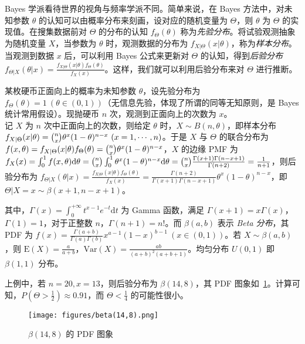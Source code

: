 \documentclass[../main.tex]{subfiles}
\begin{document}
Bayes 学派看待世界的视角与频率学派不同。简单来说，在 Bayes 方法中，对未知参数 $\theta$ 的认知可以由概率分布来刻画，设对应的随机变量为 $\Theta$，则 $\theta$ 为 $\Theta$ 的实现值。在搜集数据前对 $\Theta$ 的分布的认知 $f_\Theta(\theta)$ 称为\emph{先验分布}。将试验观测抽象为随机变量 $X$，当参数为 $\theta$ 时，观测数据的分布为 $f_{X|\Theta}(x|\theta)$，称为\emph{样本分布}。当观测到数据 $x$ 后，可以利用 Bayes 公式来更新对 $\Theta$ 的认知，得到\emph{后验分布} $f_{\Theta|X}(\theta|x)=\frac{f_{X|\Theta}(x|\theta)f_\Theta(\theta)}{f_X(x)}$。这样，我们就可以利用后验分布来对 $\Theta$ 进行推断。

\begin{example}
    某枚硬币正面向上的概率为未知参数 $\theta$，设先验分布为 $f_\Theta(\theta)=1\ (\theta\in(0,1))$（无信息先验，体现了所谓的同等无知原则，是 Bayes 统计常用假设）。现抛硬币 $n$ 次，观测到正面向上的次数为 $x$。\\
    记 $X$ 为 $n$ 次中正面向上的次数，则给定 $\theta$ 时，$X\sim B(n,\theta)$，即样本分布 $f_{X|\Theta}(x|\theta)=\tbinom nx\theta^x(1-\theta)^{n-x}\ (x=1,\cdots,n)$。于是 $X$ 与 $\Theta$ 的联合分布为 $f(x,\theta)=f_{X|\Theta}(x|\theta)f_\Theta(\theta)=\tbinom nx\theta^x(1-\theta)^{n-x}$，$X$ 的边缘 PMF 为 $f_X(x)=\int_0^1f(x,\theta)\mathrm d\theta=\tbinom nx\int_0^1\theta^x(1-\theta)^{n-x}\mathrm d\theta=\tbinom nx\frac{\Gamma(x+1)\Gamma(n-x+1)}{\Gamma(n+2)}=\frac1{n+1}$，则后验分布为 $f_{\Theta|X}(\theta|x)=\frac{f_{X|\Theta}(x|\theta)f_\Theta(\theta)}{f_X(x)}=\frac{\Gamma(n+2)}{\Gamma(x+1)\Gamma(n-x+1)}\theta^x(1-\theta)^{n-x}$，即 $\Theta|X=x\sim\beta(x+1,n-x+1)$。
\end{example}

其中，$\Gamma(x)=\int_0^{+\infty} t^{x-1}e^{-t}\mathrm dt$ 为 Gamma 函数，满足 $\Gamma(x+1)=x\Gamma(x)$，$\Gamma(1)=1$，对于正整数 $n$，$\Gamma(n+1)=n!$。而 $\beta(a,b)$ 表示 \emph{Beta 分布}，其 PDF 为 $f(x)=\frac{\Gamma(a+b)}{\Gamma(a)\Gamma(b)}x^{a-1}(1-x)^{b-1}\ (x\in(0,1))$。若 $X\sim\beta(a,b)$，则 $\mathrm E(X)=\frac a{a+b}$，$\mathrm{Var}(X)=\frac{ab}{(a+b)^2(a+b+1)}$。均匀分布 $U(0,1)$ 即 $\beta(1,1)$ 分布。

上例中，若 $n=20,x=13$，则后验分布为 $\beta(14,8)$，其 PDF 图象如~\ref{fig:6.5.1}。计算可知，$P(\Theta>\frac12)\approx0.91$，而 $\Theta<\frac14$ 的可能性很小。

\begin{figure}[!h]
    \centering
    \texttt{[image: figures/beta(14,8).png]}
    \caption{$\beta(14,8)$ 的 PDF 图象}
    \label{fig:6.5.1}
\end{figure}
\end{document}
